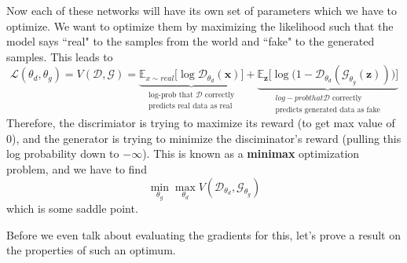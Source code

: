 \documentclass{article}
\begin{document}
  \begin{definition}
    Now each of these networks will have its own set of parameters which we have to optimize. We want to optimize them by maximizing the likelihood such that the model says ``real" to the samples from the world and ``fake" to the generated samples. This leads to 
    \begin{equation}
      \mathcal{L}(\theta_d, \theta_g) = V(\mathcal{D}, \mathcal{G}) = \underbrace{\mathbb{E}_{x \sim real} \big[ \log \mathcal{D}_{\theta_d}(\mathbf{x}) \big]}_{\substack{\text{log-prob that } \mathcal{D} \text{ correctly} \\ \text{predicts real data as real}}} + \underbrace{\mathbb{E}_{\mathbf{z}} \big[ \log \big( 1 - \mathcal{D}_{\theta_d} ( \mathcal{G}_{\theta_g} (\mathbf{z}))\big)\big]}_{\substack{{log-prob that } \mathcal{D} \text{ correctly} \\ \text{predicts generated data as fake} }}
    \end{equation}
    Therefore, the discrimiator is trying to maximize its reward (to get max value of $0$), and the generator is trying to minimize the disciminator's reward (pulling this log probability down to $-\infty$). This is known as a \textbf{minimax} optimization problem, and we have to find 
    \begin{equation}
      \min_{\theta_g} \max_{\theta_d} V(\mathcal{D}_{\theta_d}, \mathcal{G}_{\theta_g})
    \end{equation}
    which is some saddle point. 
  \end{definition}

  Before we even talk about evaluating the gradients for this, let's prove a result on the properties of such an optimum.   
\end{document}
